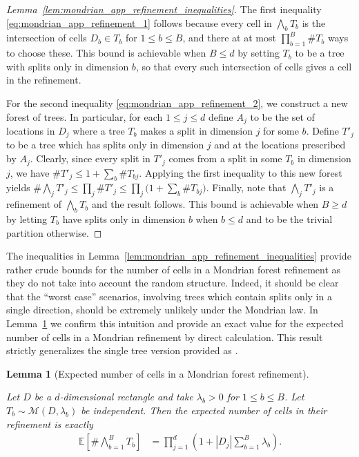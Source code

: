 \documentclass[11pt,lof]{puthesis}
\newcommand{\E}{\ensuremath{\mathbb{E}}}
\newcommand{\cM}{\ensuremath{\mathcal{M}}}
\theoremstyle{break}
\newtheorem{lemma}{Lemma}[section]
\theoremstyle{proof}
\newtheorem{proof}{Proof}
\begin{document}
\begin{proof}[Lemma~\ref{lem:mondrian_app_refinement_inequalities}]

  The first inequality \eqref{eq:mondrian_app_refinement_1}
  follows because every cell in
  $\bigwedge_b T_b$ is the intersection of cells
  $D_b \in T_b$ for $1 \leq b \leq B$, and there at at most
  $\prod_{b=1}^{B} \# T_b$ ways to choose these.
  This bound is achievable when $B \leq d$ by setting
  $T_b$ to be a tree with splits only in dimension $b$,
  so that every such intersection of cells
  gives a cell in the refinement.

  For the second inequality \eqref{eq:mondrian_app_refinement_2},
  we construct a new forest of trees.
  In particular, for each $1 \leq j \leq d$ define
  $A_j$ to be the set of locations in $D_j$ where a tree $T_b$
  makes a split in dimension $j$ for some $b$.
  Define $T'_j$ to be a tree which has splits
  only in dimension $j$ and at the locations prescribed by $A_j$.
  Clearly, since every split in $T'_j$
  comes from a split in some $T_b$ in dimension $j$,
  we have $\# T'_j \leq 1 + \sum_b \# T_{b j}$.
  Applying the first inequality to this new forest yields
  $\# \bigwedge_j T'_j \leq \prod_j \# T'_j
  \leq \prod_j \big( 1 + \sum_b \# T_{b j} \big)$.
  Finally, note that $\bigwedge_j T'_j$
  is a refinement of $\bigwedge_b T_b$ and the result follows.
  This bound is achievable when $B \geq d$ by letting
  $T_b$ have splits only in dimension $b$ when $b \leq d$
  and to be the trivial partition otherwise.
\end{proof}

The inequalities in Lemma~\ref{lem:mondrian_app_refinement_inequalities} provide
rather crude bounds for the number of cells in a Mondrian forest
refinement as they do not take into account the random structure.
Indeed, it should be clear that the ``worst case'' scenarios, involving
trees which contain splits only in a single direction, should be extremely
unlikely under the Mondrian law. In Lemma~\ref{lem:mondrian_app_refinement} we
confirm this intuition and provide an exact value for the expected number of
cells in a Mondrian refinement by direct calculation. This result strictly
generalizes the single tree version provided as
\citet[Proposition~2]{mourtada2020minimax}.

\begin{lemma}[Expected number of cells in a Mondrian forest refinement]
  \label{lem:mondrian_app_refinement}

  Let $D$ be a $d$-dimensional rectangle
  and take $\lambda_b > 0$ for $1 \leq b \leq B$.
  Let $T_b \sim \cM(D, \lambda_b)$ be independent.
  Then the expected number of cells in their refinement is exactly
  \begin{align*}
    \E\left[\# \bigwedge_{b=1}^B T_b \right]
    &= \prod_{j=1}^d \left(
      1 + |D_j| \sum_{b=1}^B \lambda_b
    \right).
  \end{align*}
\end{lemma}
\end{document}

